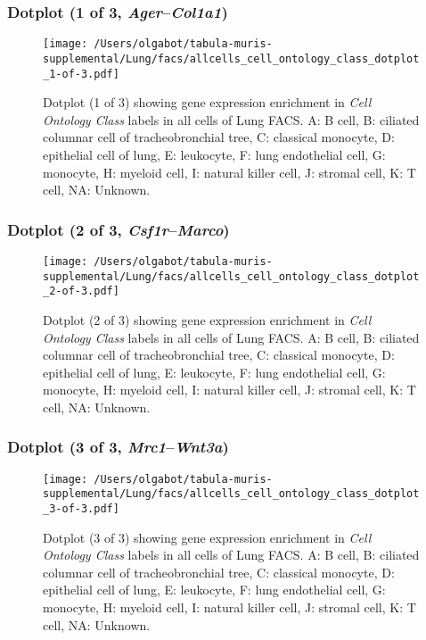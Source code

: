 \clearpage

\subsubsection{Dotplot (1 of 3, \emph{Ager}--\emph{Col1a1})}
\begin{figure}[h]
\centering
\texttt{[image: /Users/olgabot/tabula-muris-supplemental/Lung/facs/allcells\_cell\_ontology\_class\_dotplot\_1-of-3.pdf]}

\caption{ Dotplot (1 of 3)  showing gene expression enrichment in \emph{Cell Ontology Class} labels in all cells of Lung FACS. A: B cell, B: ciliated columnar cell of tracheobronchial tree, C: classical monocyte, D: epithelial cell of lung, E: leukocyte, F: lung endothelial cell, G: monocyte, H: myeloid cell, I: natural killer cell, J: stromal cell, K: T cell, NA: Unknown.}
\end{figure}


\clearpage

\subsubsection{Dotplot (2 of 3, \emph{Csf1r}--\emph{Marco})}
\begin{figure}[h]
\centering
\texttt{[image: /Users/olgabot/tabula-muris-supplemental/Lung/facs/allcells\_cell\_ontology\_class\_dotplot\_2-of-3.pdf]}

\caption{ Dotplot (2 of 3)  showing gene expression enrichment in \emph{Cell Ontology Class} labels in all cells of Lung FACS. A: B cell, B: ciliated columnar cell of tracheobronchial tree, C: classical monocyte, D: epithelial cell of lung, E: leukocyte, F: lung endothelial cell, G: monocyte, H: myeloid cell, I: natural killer cell, J: stromal cell, K: T cell, NA: Unknown.}
\end{figure}


\clearpage

\subsubsection{Dotplot (3 of 3, \emph{Mrc1}--\emph{Wnt3a})}
\begin{figure}[h]
\centering
\texttt{[image: /Users/olgabot/tabula-muris-supplemental/Lung/facs/allcells\_cell\_ontology\_class\_dotplot\_3-of-3.pdf]}

\caption{ Dotplot (3 of 3)  showing gene expression enrichment in \emph{Cell Ontology Class} labels in all cells of Lung FACS. A: B cell, B: ciliated columnar cell of tracheobronchial tree, C: classical monocyte, D: epithelial cell of lung, E: leukocyte, F: lung endothelial cell, G: monocyte, H: myeloid cell, I: natural killer cell, J: stromal cell, K: T cell, NA: Unknown.}
\end{figure}


